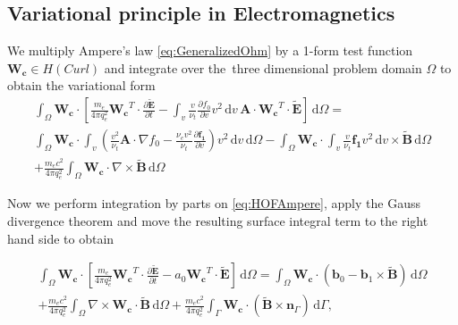 \documentclass[preprint,12pt]{elsarticle}
\newcommand{\pdv}[2]{\frac{\partial{#1}}{\partial{#2}}}
\newcommand{\vect}[1]{\boldsymbol{#1}}
\newcommand{\matr}[1]{\mathbf{#1}}
\newcommand{\dI}{\text{d}}
\newcommand{\nue}{\nu_{e}}
\newcommand{\nutot}{\nu_{t}}
\newcommand{\vmag}{v}
\newcommand{\vn}{\vect{n}}
\newcommand{\tE}{\vect{\tilde{E}}}
\newcommand{\tB}{\vect{\tilde{B}}}
\newcommand{\qe}{q_e}
\newcommand{\me}{m_e}
\newcommand{\fzero}{f_0}
\newcommand{\fone}{\vect{f_1}}
\newcommand{\MA}{\matr{A}}
\newcommand{\intO}{\int_{\Omega}}
\newcommand{\intv}{\int_{\vmag}}
\newcommand{\Wcurl}{\vect{W_c}}
\newcounter{bla}
\begin{document}
\subsection{Variational principle in Electromagnetics}
We multiply Ampere’s law \eqref{eq:GeneralizedOhm} by a 1-form test function 
$\Wcurl \in H(Curl)$ and integrate over the~three dimensional problem domain $\Omega$ 
to obtain the variational form
\begin{multline}
  \intO \Wcurl\cdot\left[\frac{\me}{4\pi\qe^2}
  \Wcurl^T\cdot\pdv{\tE}{t} 
  - \intv\frac{\vmag}{\nutot} \pdv{\fzero}{\vmag}\vmag^2\, \dI\vmag\, 
  \MA\cdot\Wcurl^T\cdot\tE 
  \right]\, \dI\Omega
   = \\ 
  \intO \Wcurl\cdot
  \intv\left(  
  \frac{\vmag^2}{\nutot}\MA\cdot\nabla\fzero
  - \frac{\nue\vmag^2}{\nutot}\pdv{\fone}{\vmag}
  \right)\vmag^2\, \dI\vmag 
  \, \dI\Omega
  - \intO \Wcurl\cdot\intv
  \frac{\vmag}{\nutot}\fone 
  \vmag^2\, \dI\vmag \times\tB
  \, \dI\Omega\\
  + \frac{\me c^2}{4\pi\qe^2}\intO \Wcurl\cdot \nabla\times\tB\, \dI\Omega
  \label{eq:HOFAmpere} 
\end{multline}

Now we perform integration by parts on \eqref{eq:HOFAmpere}, apply the Gauss divergence theorem
and move the resulting surface integral term to the right hand side to obtain

\begin{multline}
  \intO \Wcurl\cdot\left[\frac{\me}{4\pi\qe^2}
  \Wcurl^T\cdot\pdv{\tE}{t} 
  - a_0\Wcurl^T\cdot\tE 
  \right]\, \dI\Omega
   =  
  \intO \Wcurl\cdot\left(\vect{b}_{0} - \vect{b}_{1}\times\tB \right)
  \, \dI\Omega\\
  + \frac{\me c^2}{4\pi\qe^2}\intO \nabla\times\Wcurl\cdot\tB\, \dI\Omega + 
  \frac{\me c^2}{4\pi\qe^2}
  \int_{\Gamma} \Wcurl\cdot\left(\tB\times\vect{n}_{\Gamma}\right)\, \dI\Gamma ,
  \label{eq:WeakHOFAmpere} 
\end{multline}
\end{document}
